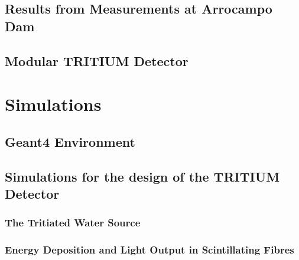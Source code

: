 \documentclass[12pt,a4paper]{book}
\begin{document}
	\section[Experimental Results in Arrocampo Dam]{Results from Measurements at Arrocampo Dam}\label{sec:ResultsArrocampo}
	
	\newpage
		
	\section[Modular TRITIUM Detector]{Modular TRITIUM Detector}\label{sec:TritiumMonitor}
	
	\newpage

\chapter{Simulations}  \label{chap:Simulations}	
	
	
	\section{Geant4 Environment}\label{sec:Geant4Environment}
	
	
	\section{Simulations for the design of the TRITIUM Detector}\label{sec:TRITIUMSimulationsDesign}
	
	
		\subsection[The Tritiated Water Source]{The Tritiated Water Source}\label{subsec:SourceShapeSimulation}
		
		
		\subsection[Energy Deposition and Light Output in Scintillating Fibres]{Energy Deposition and Light Output in Scintillating Fibres}\label{subsec:LightOutputFibers}
		
		
\end{document}
